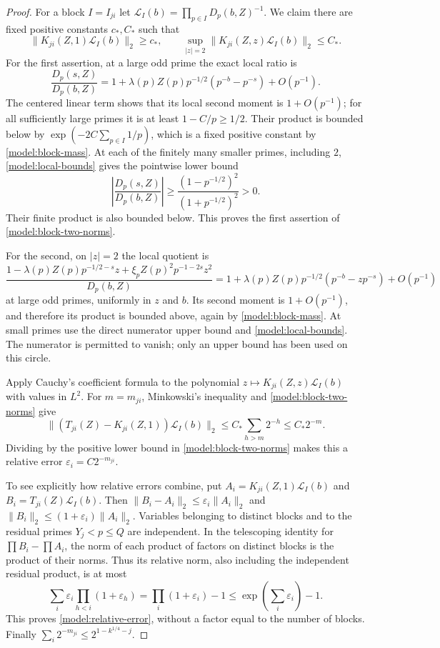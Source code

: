 \begin{proof}
For a block $I=I_{ji}$ let
$\mathcal L_I(b)=\prod_{p\in I}D_p(b,Z)^{-1}$.  We claim there are
fixed positive constants $c_*,C_*$ such that
\begin{equation}
 \|K_{ji}(Z,1)\mathcal L_I(b)\|_2\ge c_*,\qquad
 \sup_{|z|=2}\|K_{ji}(Z,z)\mathcal L_I(b)\|_2\le C_*.
 \label{model:block-two-norms}
\end{equation}
For the first assertion, at a large odd prime the exact local ratio is
\[
 \frac{D_p(s,Z)}{D_p(b,Z)}
 =1+\lambda(p)Z(p)p^{-1/2}(p^{-b}-p^{-s})+O(p^{-1}).
\]
The centered linear term shows that its local second moment is
$1+O(p^{-1})$; for all sufficiently large primes it is at least
$1-C/p\ge1/2$.  Their product is bounded below by
$\exp(-2C\sum_{p\in I}1/p)$, which is a fixed positive constant by
\eqref{model:block-mass}.  At each of the finitely many smaller primes,
including $2$, \eqref{model:local-bounds} gives the pointwise lower bound
\[
 \left|\frac{D_p(s,Z)}{D_p(b,Z)}\right|
 \ge\frac{(1-p^{-1/2})^2}{(1+p^{-1/2})^2}>0.
\]
Their finite product is also bounded below.  This proves the first
assertion of \eqref{model:block-two-norms}.

For the second, on $|z|=2$ the local quotient is
\[
 \frac{1-\lambda(p)Z(p)p^{-1/2-s}z
                +\xi_p Z(p)^2p^{-1-2s}z^2}{D_p(b,Z)}
 =1+\lambda(p)Z(p)p^{-1/2}(p^{-b}-zp^{-s})+O(p^{-1})
\]
at large odd primes, uniformly in $z$ and $b$.  Its second moment is
$1+O(p^{-1})$, and therefore its product is bounded above, again by
\eqref{model:block-mass}.  At small primes use the direct numerator
upper bound and \eqref{model:local-bounds}.  The numerator is permitted
to vanish; only an upper bound has been used on this circle.

Apply Cauchy's coefficient formula to the polynomial
$z\mapsto K_{ji}(Z,z)\mathcal L_I(b)$ with values in $L^2$.
For $m=m_{ji}$, Minkowski's inequality and
\eqref{model:block-two-norms} give
\[
 \|(T_{ji}(Z)-K_{ji}(Z,1))\mathcal L_I(b)\|_2
 \le C_*\sum_{h>m}2^{-h}\le C_*2^{-m}.
\]
Dividing by the positive lower bound in
\eqref{model:block-two-norms} makes this a relative error
$\varepsilon_i=C2^{-m_{ji}}$.

To see explicitly how relative errors combine, put
$A_i=K_{ji}(Z,1)\mathcal L_I(b)$ and
$B_i=T_{ji}(Z)\mathcal L_I(b)$.  Then
$\|B_i-A_i\|_2\le\varepsilon_i\|A_i\|_2$ and
$\|B_i\|_2\le(1+\varepsilon_i)\|A_i\|_2$.
Variables belonging to distinct blocks and to the residual primes
$Y_j<p\le Q$ are independent.  In the telescoping identity for
$\prod B_i-\prod A_i$, the norm of each product of factors on distinct
blocks is the product of their norms.  Thus its relative norm, also
including the independent residual product, is at most
\[
 \sum_i\varepsilon_i\prod_{h<i}(1+\varepsilon_h)
   =\prod_i(1+\varepsilon_i)-1
   \le\exp\left(\sum_i\varepsilon_i\right)-1.
\]
This proves \eqref{model:relative-error}, without a factor equal to
the number of blocks.  Finally
$\sum_i2^{-m_{ji}}\le2^{1-k^{1/4}-j}$.
\end{proof}

